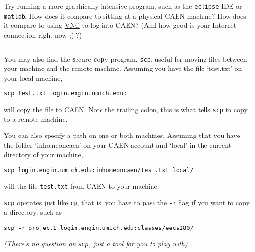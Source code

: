 \documentclass{article}
\begin{document}
Try running a more graphically intensive program, such as the \texttt{eclipse}
IDE or \texttt{matlab}. How does it compare to sitting at a physical CAEN
machine? How does it compare to using
\href{http://caenfaq.engin.umich.edu/12374-Linux-Login-Service/how-do-i-connect-to-a-caen-linux-computer-remotely}{VNC}
to log into CAEN? (And how good is your Internet connection right now ;) ?)

\bigskip
\hrule
You may also find the \textbf{s}ecure \textbf{c}o\textbf{p}y program,
\texttt{scp}, useful for moving files between your machine and the remote
machine. Assuming you have the file `test.txt' on your local machine,

\texttt{scp~test.txt~login.engin.umich.edu:}

will copy the file to CAEN. Note the trailing colon, this is what tells
\texttt{scp} to copy to a remote machine.

You can also specify a path on one or both machines. Assuming that you have
the folder `inhomeoncaen' on your CAEN account and `local' in the current
directory of your machine,

\texttt{scp~login.engin.umich.edu:inhomeoncaen/test.txt~local/}

will the file \texttt{test.txt} from CAEN to your machine.

\texttt{scp} operates just like \texttt{cp}, that is, you have to pass the
\texttt{-r} flag if you want to copy a directory, such as

\texttt{scp~-r~project1~login.engin.umich.edu:classes/eecs280/}

\emph{(There's no question on \texttt{scp}, just a tool for you to play with)}
\end{document}

